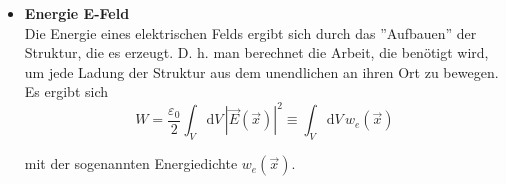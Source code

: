 \documentclass{article}
\newcommand{\diff}{\mathrm{d}}
\begin{document}
\begin{itemize}
		
		\item \textbf{Energie E-Feld}\\
		Die Energie eines elektrischen Felds ergibt sich durch das ''Aufbauen'' der Struktur, die es erzeugt. D. h. man berechnet die Arbeit, die benötigt wird, um jede Ladung der Struktur aus dem unendlichen an ihren Ort zu bewegen. Es ergibt sich
		\begin{equation}
			W = \frac{\varepsilon_0}{2} \int_V \diff V\, |\vec{E}(\vec{x})|^2 \equiv \int_V \diff V\, w_e(\vec{x})
		\end{equation}
	
		mit der sogenannten Energiedichte $w_e(\vec{x})$.
	\end{itemize}


\end{document}
